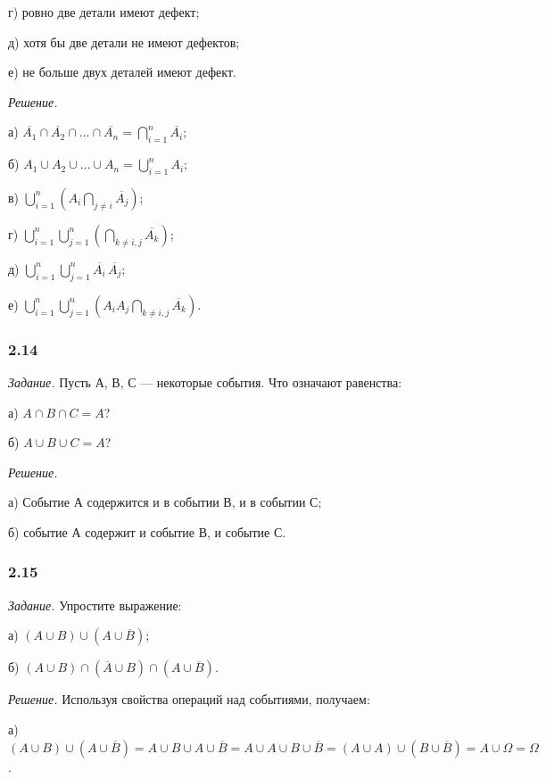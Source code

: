 \documentclass{book}
\begin{document}
г) ровно две детали имеют дефект;

д) хотя бы две детали не имеют дефектов;

е) не больше двух деталей имеют дефект.

\textit{Решение.}

а) $\overline{A_1}\cap\overline{A_2}\cap \dotsc \cap\overline{A_n}=\bigcap\limits_{i=1}^n\overline{A_i}$;

б) $A_1\cup A_2\cup \dotsc \cup A_n=\bigcup\limits_{i=1}^nA_i$;

в) $\bigcup\limits_{i=1}^n\left(A_i\bigcap\limits_{j\neq i}\overline{A_j}\right)$;

г) $\bigcup\limits_{i=1}^n\bigcup\limits_{j=1}^n\left(\bigcap\limits_{k\neq i, j}\overline{A_k}\right)$;

д) $\bigcup\limits_{i=1}^n\bigcup\limits_{j=1}^n\overline{A_i}\,\overline{A_j}$;

е) $\bigcup\limits_{i=1}^n\bigcup\limits_{j=1}^n\left(A_iA_j\bigcap\limits_{k\neq i, j}\overline{A_k}\right)$.

\subsubsection*{2.14}

\textit{Задание.} Пусть А, В, С --- некоторые события. Что означают равенства:

а) $A\cap B\cap C=A$?

б) $A\cup B\cup C=A$?

\textit{Решение.}

а) Событие А содержится и в событии В, и в событии С;

б) событие А содержит и событие В, и событие С.

\subsubsection*{2.15}

\textit{Задание.} Упростите выражение:

а) $\left(A\cup B\right)\cup\left(A\cup\overline{B}\right)$;

б) $\left(A\cup B\right)\cap\left(\overline{A}\cup B\right)\cap\left(A\cup\overline{B}\right)$.

\textit{Решение.} Используя свойства операций над событиями, получаем:

а) $\left(A\cup B\right)\cup\left(A\cup\overline{B}\right)=A\cup B\cup A\cup\overline{B}=A\cup A\cup B\cup\overline{B}=\left(A\cup A\right)\cup\left(B\cup\overline{B}\right)=A\cup\Omega=\Omega$.
\end{document}
